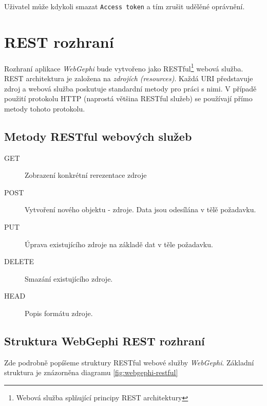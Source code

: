 \documentclass[thesis=M,czech]{FITthesis}[2014/05/6]
\begin{document}
Uživatel může kdykoli smazat \texttt{Access token} a tím zrušit udělěné oprávnění.

\section{REST rozhraní}
Rozhraní aplikace \textit{WebGephi} bude vytvořeno jako RESTful\footnote{Webová služba splňující principy REST architektury} webová služba. REST architektura je 
založena na \textit{zdrojích (resources)}. Každá URI představuje zdroj a webová služba poskutuje standardní metody pro práci s nimi. V případě použití protokolu HTTP (naprostá většina RESTful služeb) se 
používají přímo metody tohoto protokolu.

\subsection{Metody RESTful webových služeb}
\begin{description}
  \item[GET] Zobrazení konkrétní rerezentace zdroje
  \item[POST] Vytvoření nového objektu - zdroje. Data jsou odesílána v tělě požadavku. 
  \item[PUT] Úprava existujícího zdroje na základě dat v těle požadavku.
  \item[DELETE] Smazání existujícího zdroje.
  \item[HEAD] Popis formátu zdroje.
\end{description}
 

\subsection{Struktura WebGephi REST rozhraní}
Zde podrobně popíšeme struktury RESTful webové služby \textit{WebGephi}. Základní struktura je znázorněna diagramu \ref{fig:webgephi-restful}
\end{document}
